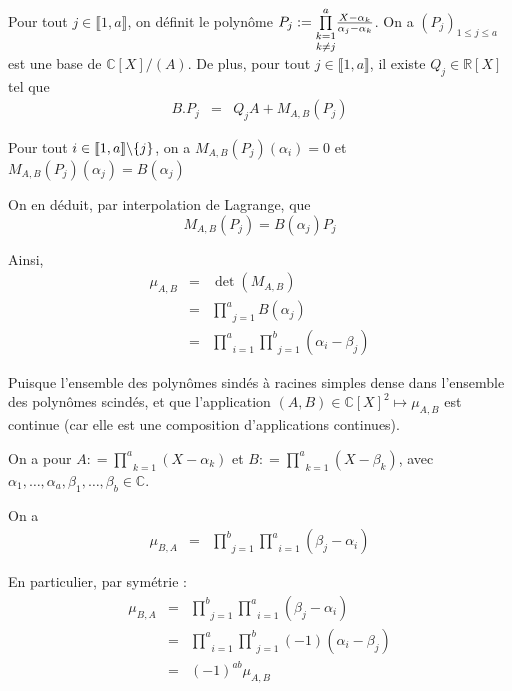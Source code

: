 Pour tout $j \in \llbracket 1, a \rrbracket$, on d{\'e}finit le polyn{\^o}me
$P_j := \underset{k \not{=} j}{\underset{k = 1}{\overset{a}{\prod}}}
\frac{X - \alpha_k}{\alpha_j - \alpha_k}$. On a $(P_j)_{1 \leqslant j
\leqslant a}$ est une base de $\mathbb{C} [X] / (A)$. De plus, pour tout $j
\in \llbracket 1, a \rrbracket$, il existe $Q_j \in \mathbb{R} [X]$ tel que
\begin{eqnarray*}
  B.P_j & = & Q_j A + M_{A, B} (P_j)
\end{eqnarray*}


Pour tout $i \in \llbracket 1, a \rrbracket \backslash \{ j \} $, on
a $M_{A, B} (P_j) (\alpha_i) = 0$ et $M_{A, B} (P_j) (\alpha_j) = B
(\alpha_j)$

On en d{\'e}duit, par interpolation de Lagrange, que
\[ M_{A, B} (P_j) = B (\alpha_j) P_j \]


Ainsi,
\begin{eqnarray*}
  \mu_{A, B} & = & \det (M_{A, B})\\
  & = & \underset{}{\overset{}{}} \underset{j = 1}{\overset{a}{\prod}} B
  (\alpha_j)\\
  & = & \underset{i = 1}{\overset{a}{\prod}} \underset{j =
  1}{\overset{b}{\prod}} (\alpha_i - \beta_j)
\end{eqnarray*}


Puisque l'ensemble des polyn{\^o}mes sind{\'e}s {\`a} racines simples dense
dans l'ensemble des polyn{\^o}mes scind{\'e}s, et que l'application $(A, B)
\in \mathbb{C} [X]^2 \longmapsto \mu_{A, B}$ est continue (car elle est une
composition d'applications continues).

On a pour $A : = \underset{k = 1}{\overset{a}{\prod}} (X - \alpha_k)$ et $B :
= \underset{k = 1}{\overset{a}{\prod}} (X - \beta_k)$, avec $\alpha_1, \ldots,
\alpha_a, \beta_1, \ldots, \beta_b \in \mathbb{C}$.

On a
\[ \begin{array}{lll}
     \mu_{B, A} & = & \underset{j = 1}{\overset{b}{\prod}} \underset{i =
     1}{\overset{a}{\prod}} (\beta_j - \alpha_i)
   \end{array} \]


En particulier, par sym{\'e}trie :
\begin{eqnarray*}
  \mu_{B, A} & = & \underset{j = 1}{\overset{b}{\prod}} \underset{i =
  1}{\overset{a}{\prod}} (\beta_j - \alpha_i)\\
  & = & \underset{i = 1}{\overset{a}{\prod}} \underset{j =
  1}{\overset{b}{\prod}} (- 1) (\alpha_i - \beta_j)\\
  & = & (- 1)^{a b} \mu_{A, B}
\end{eqnarray*}



